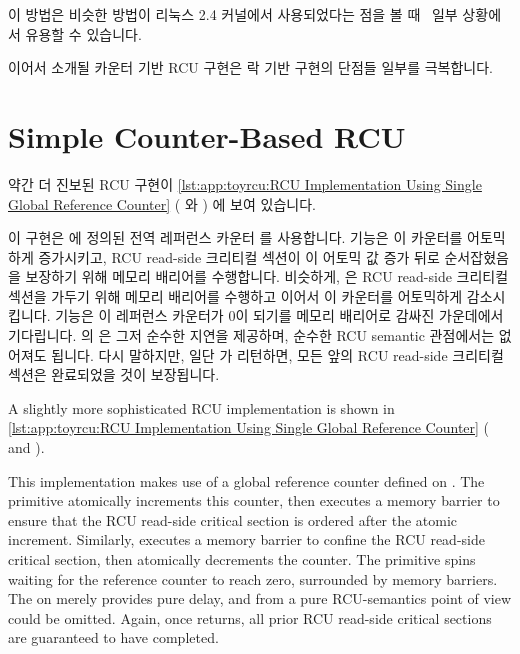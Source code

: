 이 방법은 비슷한 방법이 리눅스 2.4 커널에서 사용되었다는 점을 볼
때~\cite{Molnar00a} 일부 상황에서 유용할 수 있습니다.

이어서 소개될 카운터 기반 RCU 구현은 락 기반 구현의 단점들 일부를 극복합니다.

\iffalse

This approach could be useful in some situations, given that a similar
approach was used in the
Linux 2.4 kernel~\cite{Molnar00a}.

The counter-based RCU implementation described next overcomes some of
the shortcomings of the lock-based implementation.

\fi

\section{Simple Counter-Based RCU}
\label{sec:app:toyrcu:Simple Counter-Based RCU}

약간 더 진보된 RCU 구현이
\cref{lst:app:toyrcu:RCU Implementation Using Single Global Reference Counter}
( 와 ) 에 보여 있습니다.
\begin{fcvref}
이 구현은  에 정의된 전역 레퍼런스 카운터
 를 사용합니다.
 기능은 이 카운터를 어토믹하게 증가시키고, RCU read-side
크리티컬 섹션이 이 어토믹 값 증가 뒤로 순서잡혔음을 보장하기 위해 메모리
배리어를 수행합니다.
비슷하게,  은 RCU read-side 크리티컬 섹션을 가두기 위해
메모리 배리어를 수행하고 이어서 이 카운터를 어토믹하게 감소시킵니다.
 기능은 이 레퍼런스 카운터가 0이 되기를 메모리 배리어로
감싸진 가운데에서 기다립니다.
 의  은 그저 순수한 지연을 제공하며, 순수한 RCU
semantic 관점에서는 없어져도 됩니다.
다시 말하지만, 일단  가 리턴하면, 모든 앞의 RCU read-side
크리티컬 섹션은 완료되었을 것이 보장됩니다.
\end{fcvref}

\iffalse

A slightly more sophisticated RCU implementation is shown in
\cref{lst:app:toyrcu:RCU Implementation Using Single Global Reference Counter}
( and ).
\begin{fcvref}
This implementation makes use of a global reference counter
 defined on .
The  primitive atomically increments this
counter, then executes a memory barrier to ensure that the
RCU read-side critical section is ordered after the atomic
increment.
Similarly,  executes a memory barrier to
confine the RCU read-side critical section, then atomically
decrements the counter.
The  primitive spins waiting for the reference
counter to reach zero, surrounded by memory barriers.
The  on  merely provides pure delay, and from
a pure RCU-semantics point of view could be omitted.
Again, once  returns, all prior
RCU read-side critical sections are guaranteed to have completed.
\end{fcvref}

